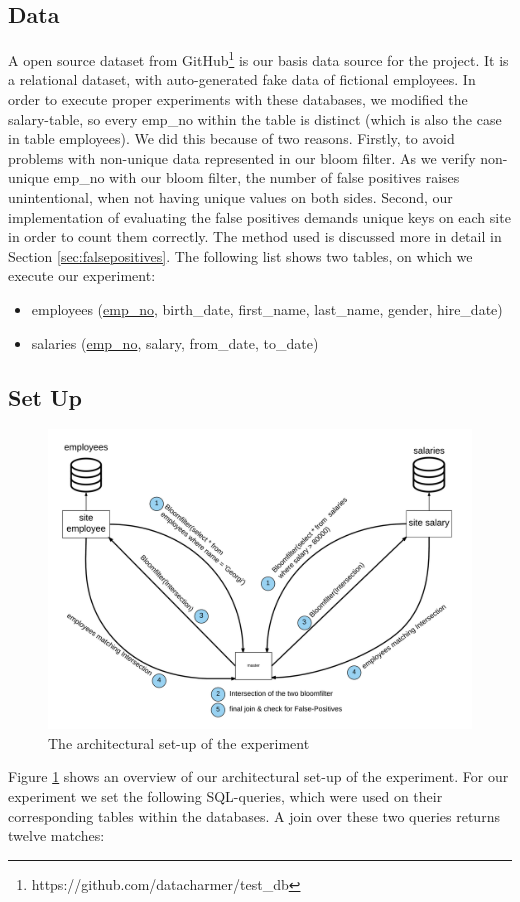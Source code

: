 \documentclass[12]{scrartcl}
\begin{document}
\subsection{Data}
A open source dataset from GitHub\footnote{https://github.com/datacharmer/test\_db} is our basis data source for the project. It is a relational dataset, with auto-generated fake data of fictional employees. In order to execute proper experiments with these databases, we modified the salary-table, so every emp\_no within the table is distinct (which is also the case in table employees). We did this because of two reasons. Firstly, to avoid problems with non-unique data represented in our bloom filter. As we verify non-unique emp\_no with our bloom filter, the number of false positives raises unintentional, when not having unique values on both sides. Second, our implementation of evaluating the false positives demands unique keys on each site in order to count them correctly. The method used is discussed more in detail in Section \ref{sec:falsepositives}. The following list shows two tables, on which we execute our experiment:
\begin{itemize}
	\item employees (\uline{emp\_no}, birth\_date, first\_name, last\_name, gender, hire\_date)
	\item salaries (\uline{emp\_no}, salary, from\_date, to\_date)
\end{itemize}

\subsection{Set Up} \label{sec:setup}

\begin{figure}[H]
	\begin{center}
		\includegraphics[scale=0.1]{res/architecture.png}
	\end{center}
	\caption{The architectural set-up of the experiment}
	\label{fig:architecture}
\end{figure}
Figure \ref{fig:architecture} shows an overview of our architectural set-up of the experiment. For our experiment we set the following SQL-queries, which were used on their corresponding tables within the databases. A join over these two queries returns twelve matches:
\end{document}
